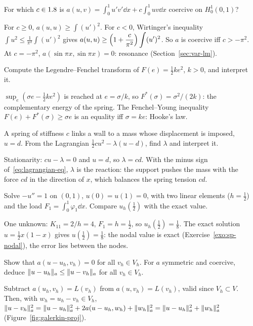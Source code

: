 \label{exo:sq-coerc}
For which $c\in1.8$ is $\displaystyle a(u,v)=\int_0^1u'v'\dd x+c\int_0^1uv\dd x$
coercive on $H^1_0(0,1)$?
\begin{solution}
For $c\ge0$, $\displaystyle a(u,u)\ge\int(u')^2$. For $c<0$, Wirtinger's inequality
$\displaystyle \int u^2\le\frac1{\pi^2}\int(u')^2$ gives
$\displaystyle a(u,u)\ge\Bigl(1+\frac{c}{\pi^2}\Bigr)\int(u')^2$. So $a$ is coercive iff $c>-\pi^2$. At
$c=-\pi^2$, $a(\sin\pi x,\sin\pi x)=0$: resonance (Section~\ref{sec:var-lm}).
\end{solution}

\label{exo:sq-lf}
Compute the Legendre--Fenchel transform of $F(e)=\tfrac12ke^2$, $k>0$, and
interpret it.
\begin{solution}
$\sup_e(\sigma e-\tfrac12ke^2)$ is reached at $e=\sigma/k$, so
$F^\ast(\sigma)=\sigma^2/(2k)$: the complementary energy of the spring. The
Fenchel--Young inequality $F(e)+F^\ast(\sigma)\ge\sigma e$ is an equality iff
$\sigma=ke$: Hooke's law.
\end{solution}

\label{exo:sq-reaction}
A spring of stiffness $c$ links a wall to a mass whose displacement is
imposed, $u=d$. From the Lagrangian $\tfrac12cu^2-\lambda(u-d)$, find $\lambda$
and interpret it.
\begin{solution}
Stationarity: $cu-\lambda=0$ and $u=d$, so $\lambda=cd$. With the minus sign
of~\eqref{eq:lagrangian-eq}, $\lambda$ is the reaction: the support pushes the
mass with the force $cd$ in the direction of $x$, which balances the spring
tension $cd$.
\end{solution}

\label{exo:sq-two-el}
Solve $-u''=1$ on $(0,1)$, $u(0)=u(1)=0$, with two linear elements
($h=\tfrac12$) and the load $\displaystyle F_1=\int_0^1\varphi_1\dd x$. Compare
$u_h(\tfrac12)$ with the exact value.
\begin{solution}
One unknown: $K_{11}=2/h=4$, $F_1=h=\tfrac12$, so $u_h(\tfrac12)=\tfrac18$. The
exact solution $u=\tfrac12x(1-x)$ gives $u(\tfrac12)=\tfrac18$: the nodal value
is exact (Exercise~\ref{exo:sp-nodal}), the error lies between the nodes.
\end{solution}

\label{exo:sq-orth}
Show that $a(u-u_h,v_h)=0$ for all $v_h\in V_h$. For $a$ symmetric and
coercive, deduce $\lVert u-u_h\rVert_a\le\lVert u-v_h\rVert_a$ for all $v_h\in V_h$.
\begin{solution}
Subtract $a(u_h,v_h)=L(v_h)$ from $a(u,v_h)=L(v_h)$, valid since
$V_h\subset V$. Then, with $w_h=u_h-v_h\in V_h$,
$\lVert u-v_h\rVert_a^2=\lVert u-u_h\rVert_a^2+2a(u-u_h,w_h)+\lVert w_h\rVert_a^2
=\lVert u-u_h\rVert_a^2+\lVert w_h\rVert_a^2$ (Figure~\ref{fig:galerkin-proj}).
\end{solution}

